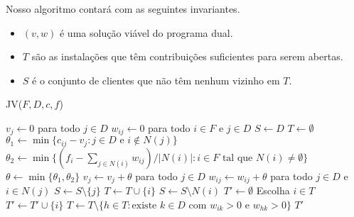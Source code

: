 \documentclass[12pt]{article}
\begin{document}
Nosso algoritmo contará com as seguintes invariantes.
\begin{itemize}
    \item $(v,w)$ é uma solução viável do programa dual.
    \item $T$ são as instalações que têm contribuições suficientes para serem abertas.
    \item $S$ é o conjunto de clientes que não têm nenhum vizinho em $T$.
\end{itemize}
\begin{algorithm}[tbh]
    \caption{JV(${F,D,c,f}$)}
    \label{fl:primaldual}
    \begin{algorithmic}[1]
        \State $v_j \gets 0$ para todo $j \in D$
        \State $w_{ij} \gets 0$ para todo $i \in F$ e $j \in D$
        \State $S \gets D$
        \State $T \gets \emptyset$
        \State $\theta_1 \gets \min\{c_{ij}-v_j : j \in D \text{ e } i \not\in N(j)\}$ \label{theta1}
        \State $\theta_2 \gets \min\{(f_i - \sum_{j \in N(i)}w_{ij})/|N(i)| : i \in F \text{ tal que } N(i) \neq \emptyset \} \label{theta2}$
        \State $\theta \gets \min\{\theta_1,\theta_2\} \label{theta}$
        \State $v_j \gets v_j + \theta$ para todo $j \in D$
        \State $w_{ij} \gets w_{ij} + \theta$ para todo $j \in D$ e $i \in N(j)$ 
        \State $S \gets S \setminus \{j\}$
        \EndIf
        \State $T \gets T \cup \{i\}$
        \State $S \gets S\setminus N(i)$
        \EndIf
        \EndWhile
        \State $T' \gets \emptyset$
        \State Escolha $i \in T$
        \State $T' \gets T' \cup \{i\}$
        \State $T \gets T \setminus \{h \in T : \text{existe $k \in D$ com $w_{ik}> 0 $ e $w_{hk} > 0$} \}$
        \EndWhile
        \State \Return $T'$
    \end{algorithmic}
\end{algorithm}
\end{document}
